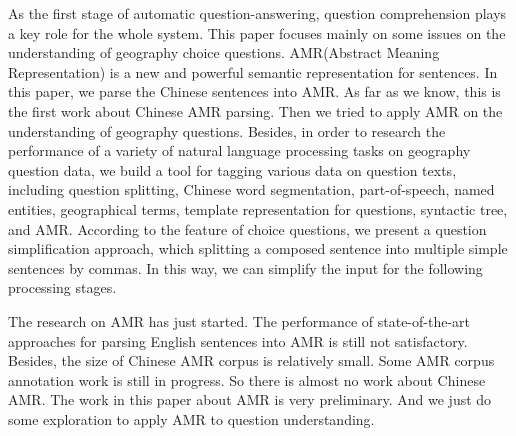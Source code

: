 \documentclass[master, winfont]{njuthesis}
\begin{document}
\begin{englishabstract}
As the first stage of automatic question-answering, question comprehension plays a key role for the whole system. This paper focuses mainly on some issues on the understanding of geography choice questions. AMR(Abstract Meaning Representation) is a new and powerful semantic representation for sentences. In this paper, we parse the Chinese sentences into AMR. As far as we know, this is the first work about Chinese AMR parsing. Then we tried to apply AMR on the understanding of geography questions. Besides, in order to research the performance of a variety of natural language processing tasks on geography question data, we build a tool for tagging various data on question texts, including question splitting, Chinese word segmentation, part-of-speech, named entities, geographical terms, template representation for questions, syntactic tree, and AMR. According to the feature of choice questions, we present a question simplification approach, which splitting a composed sentence into multiple simple sentences by commas. In this way, we can simplify the input for the following processing stages.

The research on AMR has just started. The performance of state-of-the-art approaches for parsing English sentences into AMR is still not satisfactory. Besides, the size of Chinese AMR corpus is relatively small. Some AMR corpus annotation work is still in progress. So there is almost no work about Chinese AMR. The work in this paper about AMR is very preliminary. And we just do some exploration to apply AMR to question understanding.

\end{englishabstract}

%
%
\end{document}
